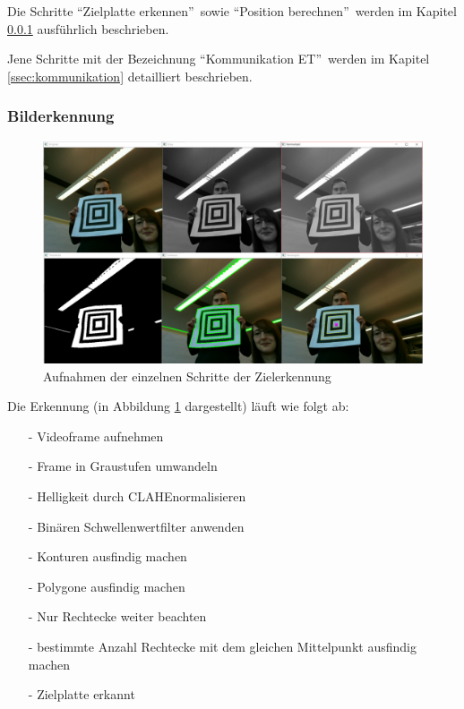 \documentclass[a4paper]{report}
\begin{document}
Die Schritte \textquotedblleft Zielplatte erkennen\textquotedblright\ sowie \textquotedblleft Position berechnen\textquotedblright\ werden im Kapitel \ref{ssec:bilderkennung} ausführlich beschrieben.

Jene Schritte mit der Bezeichnung \textquotedblleft Kommunikation ET\textquotedblright\ werden im Kapitel \ref{ssec:kommunikation} detailliert beschrieben.

\subsubsection{Bilderkennung}
\label{ssec:bilderkennung}

\begin{figure}[h!]
	\centering
	\includegraphics[keepaspectratio,width=\textwidth]{BilderkennungAblauf}
	\caption{Aufnahmen der einzelnen Schritte der Zielerkennung}
	\label{fig:AufnahmeZielerkennung}
\end{figure}

Die Erkennung (in Abbildung \ref{fig:AufnahmeZielerkennung} dargestellt) läuft wie folgt ab:

\begin{itemize}[noitemsep]
	\item[-] Videoframe aufnehmen
	\item[-] Frame in Graustufen umwandeln
	\item[-] Helligkeit durch CLAHE\footnotemark normalisieren
	\item[-] Binären Schwellenwertfilter anwenden
	\item[-] Konturen ausfindig machen
	\item[-] Polygone ausfindig machen
	\item[-] Nur Rechtecke weiter beachten
	\item[-] bestimmte Anzahl Rechtecke mit dem gleichen Mittelpunkt ausfindig machen
	\item[-] Zielplatte erkannt
\end{itemize}
\end{document}
